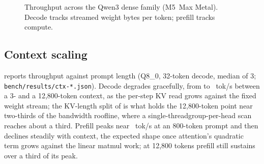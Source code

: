 \documentclass[sigconf,nonacm,screen]{acmart}
\newcommand{\code}[1]{\texttt{\small #1}}
\begin{document}
\begin{figure}[t]\centering
{}
\caption{Throughput across the Qwen3 dense family (M5~Max Metal). Decode
tracks streamed weight bytes per token; prefill tracks compute.}
\label{fig:modelsize}
\end{figure}

\subsection{Context scaling}
\label{sec:eval-context}
 reports throughput against prompt length (Q8\_0, 32-token
decode, median of 3; \code{bench/results/ctx-*.json}). Decode degrades
gracefully, from \CtxDecodeShort{} to \CtxDecodeLongest~tok/s between a 3-
and a 12{,}800-token context, as the per-step KV read grows against the
fixed weight stream; the KV-length split of  is
what holds the 12{,}800-token point near two-thirds of the bandwidth
roofline, where a single-threadgroup-per-head scan reaches about a third. Prefill peaks near \CtxPrefillPeak~tok/s at an
800-token prompt and then declines steadily with context, the expected
shape once attention's quadratic term grows against the linear matmul
work; at 12{,}800 tokens prefill still sustains over a third of its peak.
\end{document}
